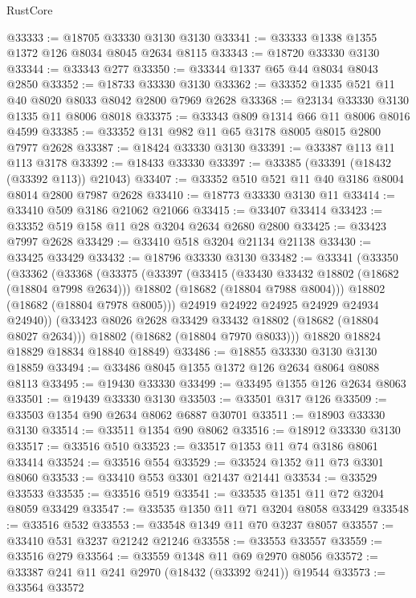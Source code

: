 \begin{lexlean}{RustCore}
\begin{coremodule}
@33333 := @18705 @33330 @3130 @3130
@33341 := @33333 @1338 @1355 @1372 @126 @8034 @8045 @2634 @8115
@33343 := @18720 @33330 @3130
@33344 := @33343 @277
@33350 := @33344 @1337 @65 @44 @8034 @8043 @2850
@33352 := @18733 @33330 @3130
@33362 := @33352 @1335 @521 @11 @40 @8020 @8033 @8042 @2800 @7969 @2628
@33368 := @23134 @33330 @3130 @1335 @11 @8006 @8018
@33375 := @33343 @809 @1314 @66 @11 @8006 @8016 @4599
@33385 := @33352 @131 @982 @11 @65 @3178 @8005 @8015 @2800 @7977 @2628
@33387 := @18424 @33330 @3130
@33391 := @33387 @113 @11 @113 @3178
@33392 := @18433 @33330
@33397 := @33385 (@33391 (@18432 (@33392 @113)) @21043)
@33407 := @33352 @510 @521 @11 @40 @3186 @8004 @8014 @2800 @7987 @2628
@33410 := @18773 @33330 @3130 @11
@33414 := @33410 @509 @3186 @21062 @21066
@33415 := @33407 @33414
@33423 := @33352 @519 @158 @11 @28 @3204 @2634 @2680 @2800
@33425 := @33423 @7997 @2628
@33429 := @33410 @518 @3204 @21134 @21138
@33430 := @33425 @33429
@33432 := @18796 @33330 @3130
@33482 := @33341
    (@33350
      (@33362
        (@33368
          (@33375
            (@33397
              (@33415
                (@33430 @33432 @18802 (@18682 (@18804 @7998 @2634)))
                @18802
                (@18682 (@18804 @7988 @8004)))
              @18802
              (@18682 (@18804 @7978 @8005)))
            @24919
            @24922
            @24925
            @24929
            @24934
            @24940))
        (@33423 @8026 @2628 @33429 @33432 @18802 (@18682 (@18804 @8027 @2634)))
        @18802
        (@18682 (@18804 @7970 @8033)))
      @18820
      @18824
      @18829
      @18834
      @18840
      @18849)
@33486 := @18855 @33330 @3130 @3130 @18859
@33494 := @33486 @8045 @1355 @1372 @126 @2634 @8064 @8088 @8113
@33495 := @19430 @33330
@33499 := @33495 @1355 @126 @2634 @8063
@33501 := @19439 @33330 @3130
@33503 := @33501 @317 @126
@33509 := @33503 @1354 @90 @2634 @8062 @6887 @30701
@33511 := @18903 @33330 @3130
@33514 := @33511 @1354 @90 @8062
@33516 := @18912 @33330 @3130
@33517 := @33516 @510
@33523 := @33517 @1353 @11 @74 @3186 @8061 @33414
@33524 := @33516 @554
@33529 := @33524 @1352 @11 @73 @3301 @8060
@33533 := @33410 @553 @3301 @21437 @21441
@33534 := @33529 @33533
@33535 := @33516 @519
@33541 := @33535 @1351 @11 @72 @3204 @8059 @33429
@33547 := @33535 @1350 @11 @71 @3204 @8058 @33429
@33548 := @33516 @532
@33553 := @33548 @1349 @11 @70 @3237 @8057
@33557 := @33410 @531 @3237 @21242 @21246
@33558 := @33553 @33557
@33559 := @33516 @279
@33564 := @33559 @1348 @11 @69 @2970 @8056
@33572 := @33387 @241 @11 @241 @2970 (@18432 (@33392 @241)) @19544
@33573 := @33564 @33572

\end{coremodule}
\end{lexlean}
